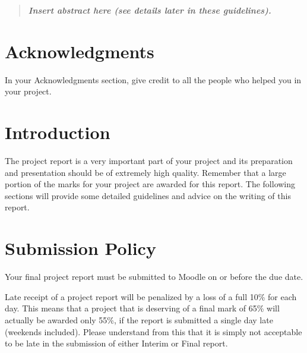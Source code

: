 \documentclass[]{final_report}
\begin{document}
\maketitle

\tableofcontents
\newpage


\begin{abstract}

\textbf{\textsl{Insert abstract here (see details later in these guidelines).}}

\end{abstract}
\newpage


\chapter*{Acknowledgments}

In your Acknowledgments section, give credit to all the people who helped you in your project.


\chapter{Introduction}
The project report is a very important part of your project and its preparation and presentation should be of extremely high quality. Remember that a large portion of the marks for your project are awarded for this report. The following sections will provide some detailed guidelines and advice on the writing of this report.

\chapter{\label{chapter2}Submission Policy}

Your final project report must be submitted to Moodle on or before the due date.

Late receipt of a project report will be penalized by a loss of a full 10\% for each day. This means that a project that is deserving of a final mark of 65\% will actually be awarded only 55\%, if the report is submitted a single day late (weekends included). Please understand from this that it is simply not acceptable to be late in the submission of either Interim or Final report.
\end{document}
